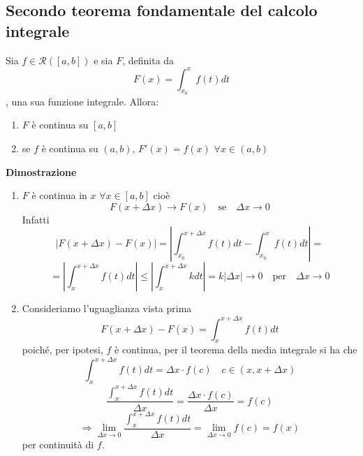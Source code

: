 \documentclass[12pt]{article}
\begin{document}
\subsection{Secondo teorema fondamentale del calcolo integrale}
Sia $f \in \mathscr{R}([a,b])$ e sia $F$, definita da 
\[F(x) = \int_{x_0}^x f(t) dt\]
, una sua funzione integrale. Allora:
\begin{enumerate}
  \item $F$ è continua su $[a,b]$
  \item se $f$ è continua su $(a,b)$, $F'(x) = f(x)$ $\forall x \in (a,b)$
\end{enumerate}
\textbf{Dimostrazione}
\begin{enumerate}
    \item 
    $F$ è continua in $x$ $\forall x \in [a,b]$ cioè
\[F(x + \Delta x) \to F(x) \quad \text{se} \quad \Delta x \to 0\] Infatti
\[|F(x + \Delta x) - F(x)| = |\int_{x_0}^{x + \Delta x} f(t) dt - \int_{x_0}^{x} f(t) dt| = \]
\[ = |\int_{x}^{x+\Delta x} f(t) dt| \leq |\int_{x}^{x+\Delta x} k dt| = k|\Delta x| \to 0 \quad \text{per} \quad \Delta x \to 0\]
    \item
    Consideriamo l'uguaglianza vista prima
\[F(x + \Delta x) - F(x) = \int_{x}^{x+\Delta x} f(t) dt\]
poiché, per ipotesi, $f$ è continua, per il teorema della media integrale si ha che
\[ \int_{x}^{x+\Delta x} f(t) dt = \Delta x \cdot f(c) \quad c \in (x, x+\Delta x)\]
\[\frac{\int_{x}^{x+\Delta x} f(t) dt}{\Delta x} = \frac{\Delta x \cdot f(c)}{\Delta x} = f(c)\]
\[ \Rightarrow \lim_{\Delta x \to 0} \frac{\int_{x}^{x+\Delta x} f(t) dt}{\Delta x} = \lim_{\Delta x \to 0} f(c) = f(x) \]
per continuità di $f$.
\end{enumerate}
\end{document}

